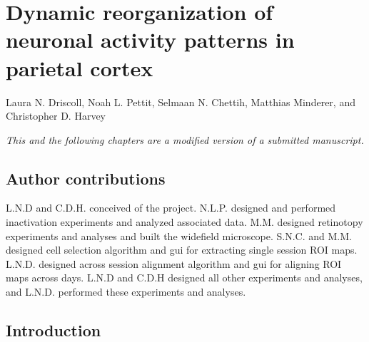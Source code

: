 \chapter{Dynamic reorganization of neuronal activity patterns in parietal cortex} 

\vspace*{-44pt}

Laura N. Driscoll, Noah L. Pettit, Selmaan N. Chettih, Matthias Minderer, and Christopher D. Harvey

\smallskip
\textit{This and the following chapters are a modified version of a submitted manuscript.}

\vspace*{50pt}

\section{Author contributions}
L.N.D and C.D.H. conceived of the project. N.L.P. designed and performed inactivation experiments and analyzed associated data. M.M. designed retinotopy experiments and analyses and built the widefield microscope. S.N.C. and M.M. designed cell selection algorithm and gui for extracting single session ROI maps. L.N.D. designed across session alignment algorithm and gui for aligning ROI maps across days. L.N.D and C.D.H designed all other experiments and analyses, and L.N.D. performed these experiments and analyses. 

\section{Introduction} \label{sec:chap3_intro}

